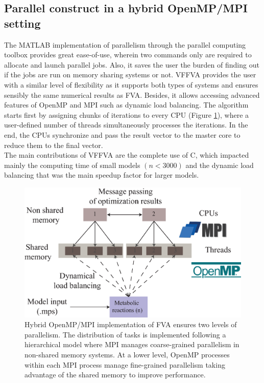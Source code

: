 \documentclass[8pt,a4paper]{book}
\begin{document}
\subsection*{Parallel construct in a hybrid OpenMP/MPI setting} 
The MATLAB implementation of parallelism through the parallel computing toolbox provides great ease-of-use, wherein two commands only are required to allocate and launch parallel jobs. Also, it saves the user the burden of finding out if the jobs are run on memory sharing systems or not. VFFVA provides the user with a similar level of flexibility as it supports both types of systems and ensures sensibly the same numerical results as FVA. Besides, it allows accessing advanced features of OpenMP and MPI such as dynamic load balancing. The algorithm starts first by assigning chunks of iterations to every CPU (Figure \ref{fig:hybrid.}), where a user-defined number of threads simultaneously processes the iterations. In the end, the CPUs synchronize and pass the result vector to the master core to reduce them to the final vector. \\
The main contributions of VFFVA are the complete use of C, which impacted mainly the computing time of small models $(n<3000)$ and the dynamic load balancing that was the main speedup factor for larger models.
\begin{figure}[!htp]
\centering
\includegraphics[width=\textwidth,height=\textheight,keepaspectratio]{scheme.eps}
\caption[Hybrid OpenMP/MPI implementation of FVA.]{Hybrid OpenMP/MPI implementation of FVA ensures two levels of parallelism. The distribution of tasks is implemented following a hierarchical model where MPI manages coarse-grained parallelism in non-shared memory systems. At a lower level, OpenMP processes within each MPI process manage fine-grained parallelism taking advantage of the shared memory to improve performance.}
\label{fig:hybrid.}
\end{figure}
\end{document}
